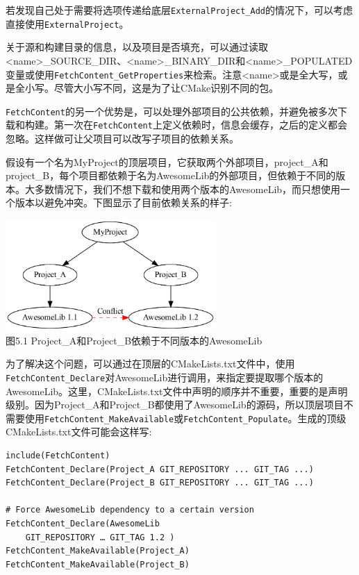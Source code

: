 \begin{tcolorbox}[colback=webgreen!5!white,colframe=webgreen!75!black,title=Note]
若发现自己处于需要将选项传递给底层\texttt{ExternalProject\_Add}的情况下，可以考虑直接使用\texttt{ExternalProject}。
\end{tcolorbox}

关于源和构建目录的信息，以及项目是否填充，可以通过读取<name>\_SOURCE\_DIR、<name>\_BINARY\_DIR和<name>\_POPULATED变量或使用\texttt{FetchContent\_GetProperties}来检索。注意<name>或是全大写，或是全小写。尽管大小写不同，这是为了让CMake识别不同的包。
 
\texttt{FetchContent}的另一个优势是，可以处理外部项目的公共依赖，并避免被多次下载和构建。第一次在\texttt{FetchContent}上定义依赖时，信息会缓存，之后的定义都会忽略。这样做可让父项目可以改写子项目的依赖关系。

假设有一个名为MyProject的顶层项目，它获取两个外部项目，project\_A和project\_B，每个项目都依赖于名为AwesomeLib的外部项目，但依赖于不同的版本。大多数情况下，我们不想下载和使用两个版本的AwesomeLib，而只想使用一个版本以避免冲突。下图显示了目前依赖关系的样子:

\begin{center}
\includegraphics[width=0.6\textwidth]{content/2/chapter5/images/1.jpg}\\
图5.1  Project\_A和Project\_B依赖于不同版本的AwesomeLib
\end{center}

为了解决这个问题，可以通过在顶层的CMakeLists.txt文件中，使用\texttt{FetchContent\_Declare}对AwesomeLib进行调用，来指定要提取哪个版本的AwesomeLib。这里，CMakeLists.txt文件中声明的顺序并不重要，重要的是声明级别。因为Project\_A和Project\_B都使用了AwesomeLib的源码，所以顶层项目不需要使用\texttt{FetchContent\_MakeAvailable}或\texttt{FetchContent\_Populate}。生成的顶级CMakeLists.txt文件可能会这样写:

\begin{lstlisting}[style=styleCMake]
include(FetchContent)
FetchContent_Declare(Project_A GIT_REPOSITORY ... GIT_TAG ...)
FetchContent_Declare(Project_B GIT_REPOSITORY ... GIT_TAG ...)

# Force AwesomeLib dependency to a certain version
FetchContent_Declare(AwesomeLib
	GIT_REPOSITORY … GIT_TAG 1.2 )
FetchContent_MakeAvailable(Project_A)
FetchContent_MakeAvailable(Project_B)
\end{lstlisting}

